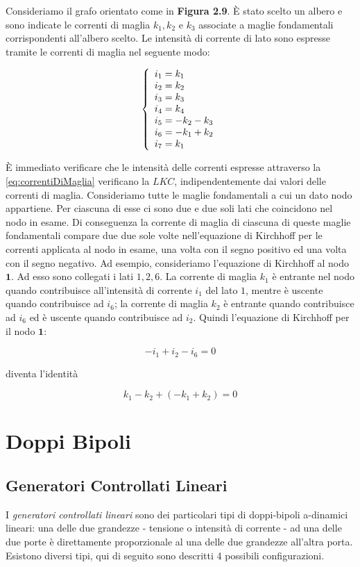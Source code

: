 \documentclass[a4paper]{report}
\begin{document}
Consideriamo il grafo orientato come in {\bf Figura 2.9}. \`E stato
scelto un albero e sono indicate le correnti di maglia $k_1,k_2$ e
$k_3$ associate a maglie fondamentali corrispondenti all'albero
scelto. Le intensit\`a di corrente di lato sono espresse tramite le
correnti di maglia nel seguente modo:

\begin{equation}\label{eq:correntiDiMaglia}
\left\{
\begin{array}{l l l l l l l}
  i_1=k_1\\
  i_2=k_2\\
  i_3=k_3\\
  i_4=k_4\\
  i_5=-k_2-k_3\\
  i_6=-k_1+k_2\\
  i_7=k_1
\end{array} \right.
\end{equation}

\`E immediato verificare che le intensit\`a delle correnti espresse
attraverso la \ref{eq:correntiDiMaglia} verificano la $LKC$,
indipendentemente dai valori delle correnti di maglia. Consideriamo
tutte le maglie fondamentali a cui un dato nodo appartiene. Per
ciascuna di esse ci sono due e due soli lati che coincidono nel nodo
in esame. Di conseguenza la corrente di maglia di ciascuna di queste
maglie fondamentali compare due due sole volte nell'equazione di
Kirchhoff per le correnti applicata al nodo in esame, una volta con il
segno positivo ed una volta con il segno negativo. 
Ad esempio, consideriamo l'equazione di Kirchhoff al nodo
$\mathbf{1}$. Ad esso sono collegati i lati $1,2,6$. La corrente di
maglia $k_1$ \`e entrante nel nodo quando contribuisce all'intensit\`a
di corrente $i_1$ del lato $1$, mentre \`e uscente quando contribuisce
ad $i_6$; la corrente di maglia $k_2$ \`e entrante quando contribuisce
ad $i_6$ ed \`e uscente quando contribuisce ad $i_2$. Quindi
l'equazione di Kirchhoff per il nodo $\mathbf{1}$:

\[
-i_1+i_2-i_6=0
\]

diventa l'identit\`a

\[
k_1-k_2+(-k_1+k_2)=0
\]

\chapter{Doppi Bipoli}
\section{Generatori Controllati Lineari}
I \emph{generatori controllati lineari} sono dei particolari tipi di
doppi-bipoli a-dinamici lineari: una delle due grandezze - tensione o
intensit\`a di corrente - ad una delle due porte \`e direttamente
proporzionale al una delle due grandezze all'altra porta. Esistono
diversi tipi, qui di seguito sono descritti 4 possibili
configurazioni.
\end{document}
